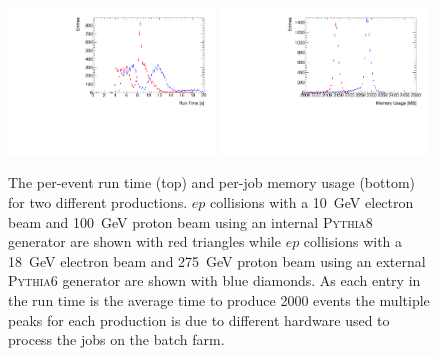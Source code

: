 	
	\begin{figure}[ht]
		\begin{center}
			\includegraphics[width=0.49\textwidth]{figs/simulation_runTime.pdf}
			\includegraphics[width=0.49\textwidth]{figs/simulation_memory.pdf}
		\end{center}
		\caption{\small The per-event run time (top) and per-job memory usage (bottom) for two different productions. $ep$ collisions with a 10~GeV electron beam and 100~GeV proton beam using an internal \textsc{Pythia8} generator are shown with red triangles while $ep$ collisions with a 18~GeV electron beam and 275~GeV proton beam using an external \textsc{Pythia6} generator are shown with  blue diamonds.  As each entry in the run time is the average time to produce 2000 events the multiple peaks for each production is due to different hardware used to process the jobs on the batch farm.}\label{fig:sim_jobs}
	\end{figure}
	
